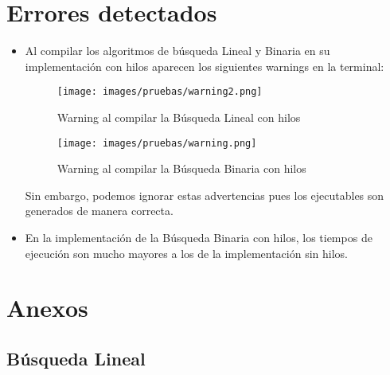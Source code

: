 \documentclass[12pt]{article}
\begin{document}
	
	\section{Errores detectados}
	\begin{itemize}
	    \item [\checkmark] Al compilar los algoritmos de búsqueda Lineal y Binaria en su implementación con hilos aparecen los siguientes warnings en la terminal:
	    
	    \begin{figure}[H]
			    	   \centering
			    	   \texttt{[image: images/pruebas/warning2.png]}
			    	   \caption{Warning al compilar la Búsqueda Lineal con hilos}
			    \end{figure}
			    
			    
	    \begin{figure}[H]
			    	   \centering
			    	   \texttt{[image: images/pruebas/warning.png]}
			    	   \caption{Warning al compilar la Búsqueda Binaria con hilos}
			    \end{figure}
			    
		Sin embargo, podemos ignorar estas advertencias pues los ejecutables son generados de manera correcta.
		
		\item [\checkmark] En la implementación de la Búsqueda Binaria con hilos, los tiempos de ejecución son mucho mayores a los de la implementación sin hilos.
		
		
	    
	\end{itemize}

\newpage


	\section{Anexos}

		\subsection{Búsqueda Lineal}
		    \inputminted{c++}{Code/Lineal.c}
		 
\end{document}
